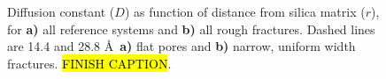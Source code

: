 %
\begin{figure}[htpb]%
\setlength{\myfigwidth}{0.58\textwidth}%
\makebox[\textwidth][c]{ %
    \begin{minipage}[t]{\myfigwidth}%
        \centering%
        \subcaption{\label{fig:diffusion_reference_systems}}%
    \end{minipage}%
    \hfill%
    \begin{minipage}[t]{\myfigwidth}%
        \centering%
        \subcaption{\label{fig:diffusion_rough_systems}}%
    \end{minipage}%
}%
\caption{%
    Diffusion constant ($D$) as function of distance from silica matrix ($r$), for \textbf{a)} all reference systems and \textbf{b)} all rough fractures. Dashed lines are 14.4 and 28.8 \AA\ \textbf{a)} flat pores and \textbf{b)} narrow, uniform width fractures. \hl{FINISH CAPTION}. %
}%
\end{figure}%



